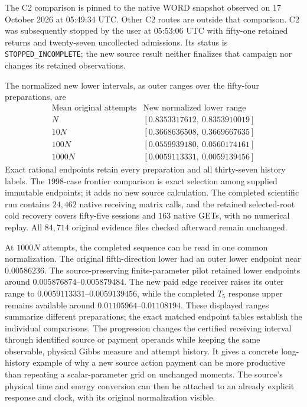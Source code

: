 The C2 comparison is pinned to the native WORD snapshot observed on 17 October 2026 at 05:49:34 UTC. Other C2 routes are outside that comparison. C2 was subsequently stopped by the user at 05:53:06 UTC with fifty-one retained returns and twenty-seven uncollected admissions. Its status is \texttt{STOPPED\_INCOMPLETE}; the new source result neither finalizes that campaign nor changes its retained observations.

The normalized new lower intervals, as outer ranges over the fifty-four preparations, are
\[
\begin{array}{c|c}
\text{Mean original attempts}&\text{New normalized lower range}\\
\hline
N &[0.8353317612,\ 0.8353910019]\\
10N &[0.3668636508,\ 0.3669667635]\\
100N &[0.0559939180,\ 0.0560174161]\\
1000N &[0.0059113331,\ 0.0059139456]
\end{array}
\]
Exact rational endpoints retain every preparation and all thirty-seven history labels. The $1998$-case frontier comparison is exact selection among supplied immutable endpoints; it adds no new source calculation. The completed scientific run contains $24{,}462$ native receiving matrix calls, and the retained selected-root cold recovery covers fifty-five sessions and $163$ native GETs, with no numerical replay. All $84{,}714$ original evidence files checked afterward remain unchanged.

At $1000N$ attempts, the completed sequence can be read in one common normalization. The original fifth-direction lower had an outer lower endpoint near $0.00586236$. The source-preserving finite-parameter pilot retained lower endpoints around $0.005876874$--$0.005879484$. The new paid edge receiver raises its outer range to $0.0059113331$--$0.0059139456$, while the completed $T_5$ response upper remains available around $0.01105964$--$0.01108194$. These displayed ranges summarize different preparations; the exact matched endpoint tables establish the individual comparisons. The progression changes the certified receiving interval through identified source or payment operands while keeping the same observable, physical Gibbs measure and attempt history. It gives a concrete long-history example of why a new source action payment can be more productive than repeating a scalar-parameter grid on unchanged moments. The source's physical time and energy conversion can then be attached to an already explicit response and clock, with its original normalization visible.


